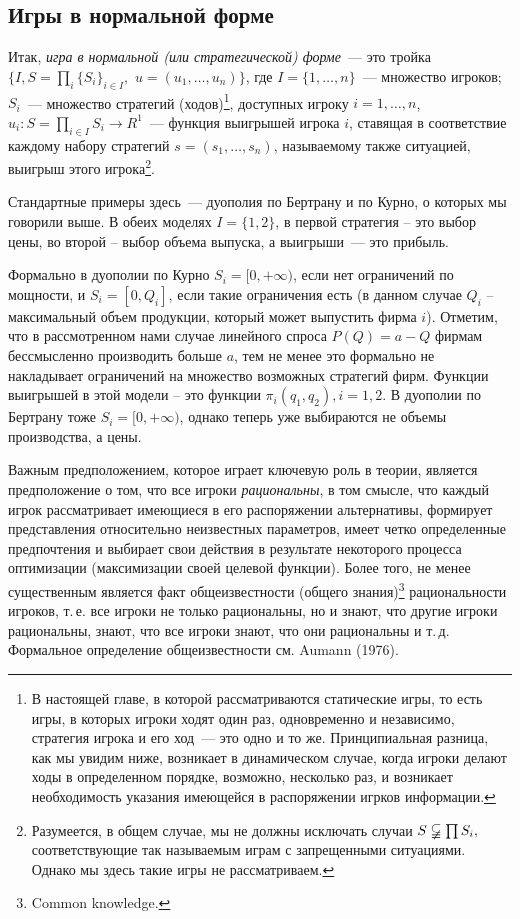 \subsection{Игры в нормальной форме}

Итак, {\it игра в нормальной (или стратегической) форме}~--- это тройка
$\{I,S=\prod_i\{S_i\}_{i\in I},\,\,u=(u_1,\ldots,u_n)\}$, где
$I=\{1,\ldots,n\}$~--- множество игроков; $S_i$~--- множество
стратегий (ходов)\footnote{В настоящей главе, в которой
рассматриваются статические игры, то есть игры, в которых игроки
ходят один раз, одновременно и независимо, стратегия игрока и его
ход~--- это одно  и то же. Принципиальная разница, как мы увидим
ниже, возникает в динамическом случае, когда игроки делают ходы
в определенном порядке, возможно, несколько раз, и возникает необходимость
указания имеющейся в распоряжении игрков информации.}, доступных игроку
$i=1,\ldots,n$, $u_i:S=\prod_{i\in I} S_i\to R^1$~--- функция
выигрышей игрока $i$, ставящая в соответствие каждому набору
стратегий $s=(s_1,\ldots,s_n)$, называемому также ситуацией, выигрыш
этого игрока\footnote{ Разумеется, в общем случае, мы не должны
исключать случаи $S\varsubsetneqq\prod S_i,$ соответствующие
так называемым играм с запрещенными ситуациями.  Однако мы здесь
такие игры не рассматриваем.}.

Стандартные примеры здесь~--- дуополия по Бертрану и по Курно, о
которых мы говорили выше. В обеих моделях $I=\{1,2\}$,
в первой стратегия -- это выбор цены, во второй -- выбор объема выпуска,
а выигрыши~--- это прибыль.

Формально в дуополии по Курно $S_i=[0,+\infty)$, если нет
ограничений по мощности, и $S_i=[0,Q_i]$, если такие ограничения
есть (в данном случае $Q_i$ -- максимальный объем продукции,
который может выпустить фирма $i$). Отметим, что в рассмотренном
нами случае линейного спроса $P(Q)=a-Q$ фирмам бессмысленно
производить больше $a$, тем не менее это формально не
накладывает ограничений на множество возможных стратегий фирм. Функции
выигрышей в этой модели -- это функции $\pi_i(q_1,q_2), i=1,2$. В
дуополии по Бертрану тоже $S_i=[0,+\infty)$, однако теперь уже
выбираются не объемы производства, а цены.

Важным предположением, которое играет ключевую роль в теории,
является предположение о том, что все игроки {\it {рациональны}}, в
том смысле, что каждый игрок рассматривает имеющиеся в его
распоряжении альтернативы, формирует представления относительно
неизвестных параметров, имеет четко определенные предпочтения и
выбирает свои действия в результате некоторого процесса оптимизации
(максимизации своей целевой функции).  Более того, не менее
существенным является факт общеизвестности (общего знания)\footnote{
Common knowledge.} рациональности игроков, т.\,е. все игроки не
только рациональны, но и знают, что другие игроки рациональны,
знают, что все игроки знают,  что они рациональны и т.\,д.
Формальное определение общеизвестности см. Aumann (1976).

